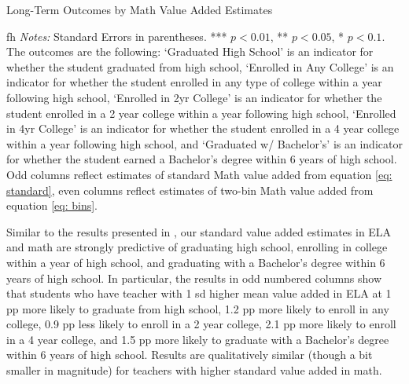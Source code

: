 \documentclass[letterpaper,12pt]{article}
\begin{document}
\begin{landscape}
    \vspace*{\fill}
    \begin{table}[ht]
        \centering
        \caption{Long-Term Outcomes by Math Value Added Estimates}
        \resizebox{1.4\textwidth}{!}{}
        \label{tab:math longterm}
    \end{table}fh
    \centering
    \footnotesize{\textit{Notes:} Standard Errors in parentheses. *** $p<0.01$, ** $p<0.05$, * $p<0.1$. The outcomes are the following: `Graduated High School' is an indicator for whether the student graduated from high school, `Enrolled in Any College' is an indicator for whether the student enrolled in any type of college within a year following high school, `Enrolled in 2yr College' is an indicator for whether the student enrolled in a 2 year college within a year following high school, `Enrolled in 4yr College' is an indicator for whether the student enrolled in a 4 year college within a year following high school, and `Graduated w/ Bachelor's' is an indicator for whether the student earned a Bachelor's degree within 6 years of high school. Odd columns reflect estimates of standard Math value added from equation \ref{eq: standard}, even columns reflect estimates of two-bin Math value added from equation \ref{eq: bins}.}
    \vspace*{\fill}
\end{landscape}

Similar to the results presented in \cite{chetty2014measuring2}, our standard value added estimates in ELA and math are strongly predictive of graduating high school, enrolling in college within a year of high school, and graduating with a Bachelor's degree within 6 years of high school. In particular, the results in odd numbered columns show that students who have teacher with 1 sd higher mean value added in ELA at 1 pp more likely to graduate from high school, 1.2 pp more likely to enroll in any college, 0.9 pp less likely to enroll in a 2 year college, 2.1 pp more likely to enroll in a 4 year college, and 1.5 pp more likely to graduate with a Bachelor's degree within 6 years of high school. Results are qualitatively similar (though a bit smaller in magnitude) for teachers with higher standard value added in math.
\end{document}
